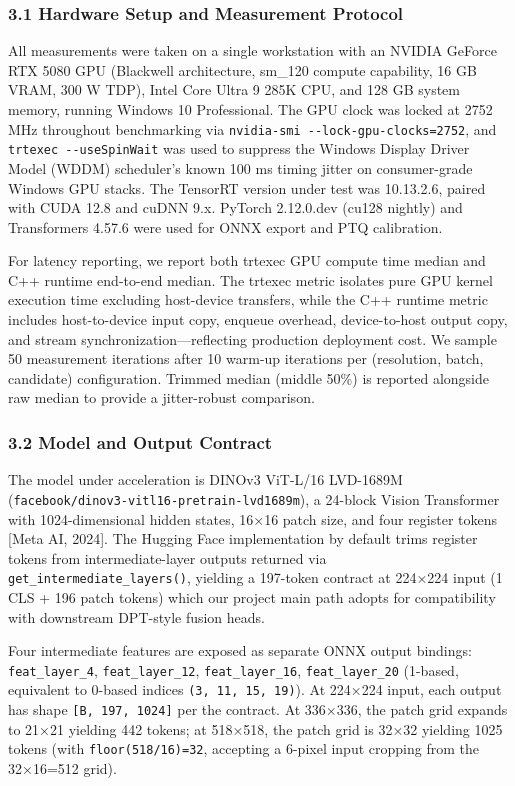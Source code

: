 \documentclass[
]{article}
\begin{document}
\subsubsection{3.1 Hardware Setup and Measurement
Protocol}\label{hardware-setup-and-measurement-protocol}

All measurements were taken on a single workstation with an NVIDIA
GeForce RTX 5080 GPU (Blackwell architecture, sm\_120 compute
capability, 16 GB VRAM, 300 W TDP), Intel Core Ultra 9 285K CPU, and 128
GB system memory, running Windows 10 Professional. The GPU clock was
locked at 2752 MHz throughout benchmarking via
\texttt{nvidia-smi\ -\/-lock-gpu-clocks=2752}, and
\texttt{trtexec\ -\/-useSpinWait} was used to suppress the Windows
Display Driver Model (WDDM) scheduler's known 100 ms timing jitter on
consumer-grade Windows GPU stacks. The TensorRT version under test was
10.13.2.6, paired with CUDA 12.8 and cuDNN 9.x. PyTorch 2.12.0.dev
(cu128 nightly) and Transformers 4.57.6 were used for ONNX export and
PTQ calibration.

For latency reporting, we report both trtexec GPU compute time median
and C++ runtime end-to-end median. The trtexec metric isolates pure GPU
kernel execution time excluding host-device transfers, while the C++
runtime metric includes host-to-device input copy, enqueue overhead,
device-to-host output copy, and stream synchronization---reflecting
production deployment cost. We sample 50 measurement iterations after 10
warm-up iterations per (resolution, batch, candidate) configuration.
Trimmed median (middle 50\%) is reported alongside raw median to provide
a jitter-robust comparison.

\subsubsection{3.2 Model and Output
Contract}\label{model-and-output-contract}

The model under acceleration is DINOv3 ViT-L/16 LVD-1689M
(\texttt{facebook/dinov3-vitl16-pretrain-lvd1689m}), a 24-block Vision
Transformer with 1024-dimensional hidden states, 16×16 patch size, and
four register tokens {[}Meta AI, 2024{]}. The Hugging Face
implementation by default trims register tokens from intermediate-layer
outputs returned via \texttt{get\_intermediate\_layers()}, yielding a
197-token contract at 224×224 input (1 CLS + 196 patch tokens) which our
project main path adopts for compatibility with downstream DPT-style
fusion heads.

Four intermediate features are exposed as separate ONNX output bindings:
\texttt{feat\_layer\_4}, \texttt{feat\_layer\_12},
\texttt{feat\_layer\_16}, \texttt{feat\_layer\_20} (1-based, equivalent
to 0-based indices \texttt{(3,\ 11,\ 15,\ 19)}). At 224×224 input, each
output has shape \texttt{{[}B,\ 197,\ 1024{]}} per the contract. At
336×336, the patch grid expands to 21×21 yielding 442 tokens; at
518×518, the patch grid is 32×32 yielding 1025 tokens (with
\texttt{floor(518/16)=32}, accepting a 6-pixel input cropping from the
32×16=512 grid).
\end{document}
